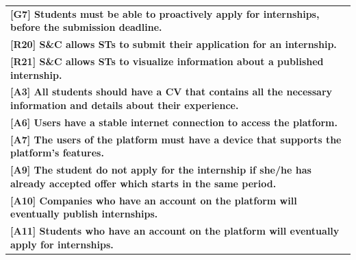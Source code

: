 \begin{center}
    \begin{tabular}{|p{37em}|}
        \rowcolor{bluepoli!40} %
        \hline
        \textbf{[G7] Students must be able to proactively apply for internships, before the submission deadline.} \\
        \rowcolor{bluepoli!15}
        \textbf{[R20] S\&C allows STs to submit their application for an internship.} \\
        \rowcolor{bluepoli!15}
        \textbf{[R21] S\&C allows STs to visualize information about a published internship.} \\
        \textbf{[A3] All students should have a CV that contains all the necessary information and details about their experience.} \\
        \textbf{[A6] Users have a stable internet connection to access the platform.}\\
        \textbf{[A7] The users of the platform must have a device that supports the platform's features.}\\
        \textbf{[A9] The student do not apply for the internship if she/he has already accepted offer which starts in the same period.}\\
        \textbf{[A10] Companies who have an account on the platform will eventually publish internships.}\\
        \textbf{[A11] Students who have an account on the platform will eventually apply for internships.}\\
        \hline
    \end{tabular}
\end{center}

